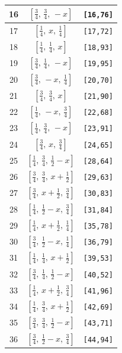 \documentclass[fleqn,8pt]{jsarticle}
\begin{document}
\begin{longtable}{ccc}
16 & $\left[ \frac{3}{4},\, \frac{3}{4},\, - x \right]$ & {\tt [16,76]} \\ \hline
17 & $\left[ \frac{1}{4},\, x,\, \frac{1}{4} \right]$ & {\tt [17,72]} \\ \hline
18 & $\left[ \frac{1}{4},\, \frac{1}{4},\, x \right]$ & {\tt [18,93]} \\ \hline
19 & $\left[ \frac{3}{4},\, \frac{1}{4},\, - x \right]$ & {\tt [19,95]} \\ \hline
20 & $\left[ \frac{3}{4},\, - x,\, \frac{1}{4} \right]$ & {\tt [20,70]} \\ \hline
21 & $\left[ \frac{3}{4},\, \frac{3}{4},\, x \right]$ & {\tt [21,90]} \\ \hline
22 & $\left[ \frac{1}{4},\, - x,\, \frac{3}{4} \right]$ & {\tt [22,68]} \\ \hline
23 & $\left[ \frac{1}{4},\, \frac{3}{4},\, - x \right]$ & {\tt [23,91]} \\ \hline
24 & $\left[ \frac{3}{4},\, x,\, \frac{3}{4} \right]$ & {\tt [24,65]} \\ \hline
25 & $\left[ \frac{1}{4},\, \frac{3}{4},\, \frac{1}{2} - x \right]$ & {\tt [28,64]} \\ \hline
26 & $\left[ \frac{3}{4},\, \frac{3}{4},\, x + \frac{1}{2} \right]$ & {\tt [29,63]} \\ \hline
27 & $\left[ \frac{3}{4},\, x + \frac{1}{2},\, \frac{3}{4} \right]$ & {\tt [30,83]} \\ \hline
28 & $\left[ \frac{1}{4},\, \frac{1}{2} - x,\, \frac{3}{4} \right]$ & {\tt [31,84]} \\ \hline
29 & $\left[ \frac{1}{4},\, x + \frac{1}{2},\, \frac{1}{4} \right]$ & {\tt [35,78]} \\ \hline
30 & $\left[ \frac{3}{4},\, \frac{1}{2} - x,\, \frac{1}{4} \right]$ & {\tt [36,79]} \\ \hline
31 & $\left[ \frac{1}{4},\, \frac{1}{4},\, x + \frac{1}{2} \right]$ & {\tt [39,53]} \\ \hline
32 & $\left[ \frac{3}{4},\, \frac{1}{4},\, \frac{1}{2} - x \right]$ & {\tt [40,52]} \\ \hline
33 & $\left[ \frac{1}{4},\, x + \frac{1}{2},\, \frac{3}{4} \right]$ & {\tt [41,96]} \\ \hline
34 & $\left[ \frac{1}{4},\, \frac{3}{4},\, x + \frac{1}{2} \right]$ & {\tt [42,69]} \\ \hline
35 & $\left[ \frac{3}{4},\, \frac{3}{4},\, \frac{1}{2} - x \right]$ & {\tt [43,71]} \\ \hline
36 & $\left[ \frac{3}{4},\, \frac{1}{2} - x,\, \frac{3}{4} \right]$ & {\tt [44,94]} \\ \hline

\end{longtable}
\end{document}

